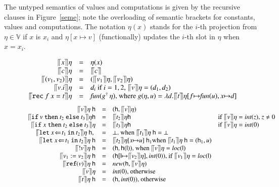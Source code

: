 \documentclass[orivec]{llncs}
\newif\iffull\fullfalse
\renewcommand{\paragraph}[1]{\noindent {\bf #1}}
\newcommand{\keywd}[1]{\mathtt{#1}}
\newcommand{\myread}[1]{!{#1}}
\newcommand{\myref}[1]{\keywd{ref}(#1)}
\newcommand{\intt}[1]{\textit{int}(#1)}
\newcommand{\reff}[1]{\textit{loc}(#1)}
\newcommand{\funn}[1]{\textit{fun}(#1)}
\newcommand{\vfix}[3]{\keywd{rec}\:{#1}\:{#2} = {#3}}
\newcommand{\letin}[2]{\keywd{let}\:{#1}\!\Leftarrow\!{#2}\:\keywd{in}\:}
\newcommand{\assign}[2]{{#1}:={#2}}
\newcommand{\myif}[3]{\keywd{if}\ #1\ \keywd{then}\ #2\
  \keywd{else}\ #3}
\newcommand{\semV}[1]{\ensuremath{\llceil {#1} \rrceil
}}
\newcommand{\cloc}{\ensuremath{\mathsf{l}}\xspace}
\newcommand\heap{\ensuremath{\mathsf{h}}\xspace}
\newcommand{\Values}{\mathbb{V}}
\begin{document}
\fulltrue
\paragraph{Semantics}
The untyped semantics of values and computations is given by
the recursive clauses in Figure~\ref{seme}; note the overloading of
semantic brackets for constants, values and computations. 
The notation
$\eta(x)$ stands for the $i$-th projection from $\eta\in\Values$
if $x$ is $x_i$ and $\eta[x{\mapsto}v]$ (functionally) updates the
$i$-th slot in $\eta$ when $x=x_i$.
\begin{figure*}[tph]
\iffull\[
\begin{array}{rcl}
\semV{x}\eta &=& \eta(x)\\ 
\semV{c}\eta &=& \semV{c}\\
\semV{(v_1,v_2)}\eta &=& (\semV{v_1}\eta,\semV{v_2}\eta)\\
\semV{v.i}\eta &=& d_i\ \mbox{if $i=1,2$, $\semV{v}\eta = (d_1,d_2)$}\\
\semV{\vfix{f}{x}t}\eta &=& \funn
{g^\dagger\,\eta}{\mbox{, where
  $g(\eta,u)=\lambda d.\semV{t}\eta[f{\mapsto}\funn{u},x{\mapsto}d]$}}
\end{array}
\]
\[
\begin{array}{rcll}
\semV{v}\eta\ \heap &=&(\heap,\semV{v}\eta)\\
\semV{\myif{v}{t_2}{t_3}}\eta\heap &=& 
\semV{t_2}\eta\heap & \mbox{if
  $\semV{v}\eta =\intt z$, $z\neq 0$}\\
\semV{\myif{x}{t_2}{t_3}}\eta &=& 
\semV{t_3}\eta\heap & \mbox{if $\semV{v}\eta=\intt 0$}
\\
\semV{\letin{x}{t_1}{t_2}}\eta\ \heap,\; &=&
\bot\mbox{, when $\semV{t_1}\eta\ \heap=\bot$}\\
\semV{\letin{x}{t_1}{t_2}}\eta\ \heap&=& 
\semV{t_2}\eta[x{\mapsto}u]\ \heap_1
\mbox{when $\semV{t_1}\eta\ \heap=(\heap_1,u)$}
\\
\semV{\myread{v}}\eta\ \heap &=& (\heap,\heap(\cloc))\mbox{, when
$\semV{v}\eta=\reff \cloc$}\\
\semV{\assign{v_1}{v_2}}\eta\ \heap &=&
(\heap[\cloc{\mapsto}\semV{v_2}\eta],\intt 0)\mbox{, if
$\semV{v_1}\eta=\reff
\cloc$}\\
\semV{\myref{v}}\eta\ \heap &=& \textit{new}(\heap,\semV{v}\eta)\\
\semV{v}\eta &=&\intt 0\mbox{, otherwise}\\
\semV{t}\eta\ \heap&=& (\heap,\intt 0)\mbox{, otherwise}
\end{array}
\]
\else
\vspace{-7mm}

\end{figure*}
\end{document}
